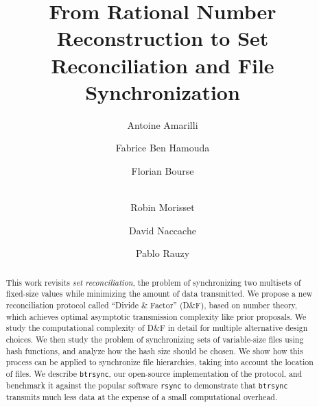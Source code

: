 \documentclass[twoside,envcountsame,runningheads]{llncs}
\newcommand{\df}{D\&F\xspace}
\newcommand{\btrsync}{\texttt{btrsync}\xspace}
\newcommand{\rsync}{\texttt{rsync}\xspace}
\begin{document}

\title{From Rational Number Reconstruction to Set Reconciliation and File
Synchronization}

\author{Antoine Amarilli \and Fabrice Ben Hamouda \and Florian Bourse \and\\
Robin Morisset \and David Naccache \and Pablo Rauzy}



\maketitle

\begin{abstract}
  This work revisits \textit{set reconciliation}, the problem of synchronizing two multisets of fixed-size values while minimizing the amount of data transmitted. We propose a new reconciliation protocol called ``Divide \& Factor'' (\df), based on number theory, which achieves optimal asymptotic transmission complexity like prior proposals. We study the computational complexity of \df in detail for multiple alternative design choices. We then study the problem of synchronizing sets of variable-size files using hash functions, and analyze how the hash size should be chosen. We show how this process can be applied to synchronize file hierarchies, taking into account the location of files. We describe \btrsync, our open-source implementation of the protocol, and benchmark it against the popular software \rsync to demonstrate that \btrsync transmits much less data at the expense of a small computational overhead.
\end{abstract}

%
\end{document}
